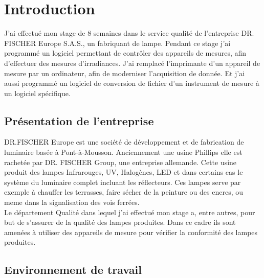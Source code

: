 \documentclass[12pt]{article}
\begin{document}
\thispagestyle{empty}

\newpage

\restoregeometry
\thispagestyle{empty}
\tableofcontents
\newpage
\onehalfspacing

\section{Introduction}

J'ai effectué mon stage de 8 semaines dans le service qualité de l'entreprise DR. FISCHER Europe S.A.S., un fabriquant de lampe.
Pendant ce stage j'ai programmé un logiciel permettant de contrôler des appareils de mesures, afin d'effectuer des mesures d'irradiances.
J'ai remplacé l'imprimante d'un appareil de mesure par un ordinateur, afin de moderniser l'acquisition de donnée.
Et j'ai aussi programmé un logiciel de conversion de fichier d'un instrument de mesure à un logiciel spécifique.


\newpage
\subsection{Présentation de l'entreprise}

DR.FISCHER Europe est une société de développement et de fabrication de luminaire basée à Pont-à-Mousson.
Anciennement une usine Phillips elle est rachetée par DR. FISCHER Group, une entreprise allemande.
Cette usine produit des lampes Infrarouges, UV, Halogènes, LED et dans certains cas le système du luminaire complet incluant les réflecteurs.
Ces lampes serve par exemple à chauffer les terrasses, faire sécher de la peinture ou des encres, ou meme dans la signalisation des vois ferrées.\\
Le département Qualité dans lequel j'ai effectué mon stage a, entre autres, pour but de s'assurer de la qualité des lampes produites.
Dans ce cadre ils sont amenées à utiliser des appareils de mesure pour vérifier la conformité des lampes produites.
\newpage

\subsection{Environnement de travail}
\end{document}
